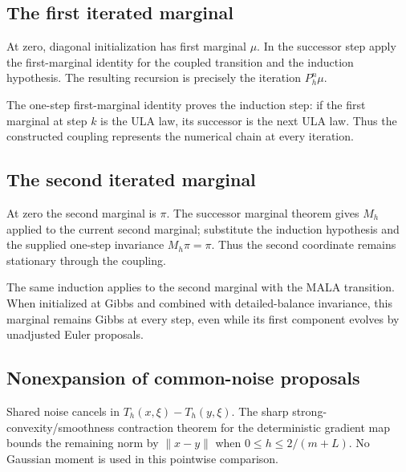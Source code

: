 \documentclass[11pt,a4paper]{report}
\begin{document}
\subsection{\texorpdfstring{The first iterated marginal}{The first iterated marginal}}
\label{report-step-UnadjustedLangevin-MALACoupling-lean-16}


At zero, diagonal initialization has first marginal \(\mu\). In the successor step apply the first-marginal identity for the coupled transition and the induction hypothesis. The resulting recursion is precisely the iteration \(P_h^n\mu\).



The one-step first-marginal identity proves the induction step: if the first marginal at step \(k\) is the ULA law, its successor is the next ULA law. Thus the constructed coupling represents the numerical chain at every iteration.

\subsection{\texorpdfstring{The second iterated marginal}{The second iterated marginal}}
\label{report-step-UnadjustedLangevin-MALACoupling-lean-17}


At zero the second marginal is \(\pi\). The successor marginal theorem gives \(M_h\) applied to the current second marginal; substitute the induction hypothesis and the supplied one-step invariance \(M_h\pi=\pi\). Thus the second coordinate remains stationary through the coupling.



The same induction applies to the second marginal with the MALA transition. When initialized at Gibbs and combined with detailed-balance invariance, this marginal remains Gibbs at every step, even while its first component evolves by unadjusted Euler proposals.

\subsection{\texorpdfstring{Nonexpansion of common-noise proposals}{Nonexpansion of common-noise proposals}}
\label{report-step-UnadjustedLangevin-MALACoupling-lean-18}


Shared noise cancels in \(T_h(x,\xi)-T_h(y,\xi)\). The sharp strong-convexity/\allowbreak{}smoothness contraction theorem for the deterministic gradient map bounds the remaining norm by \(\|x-y\|\) when \(0\le h\le2/(m+L)\). No Gaussian moment is used in this pointwise comparison.
\end{document}
